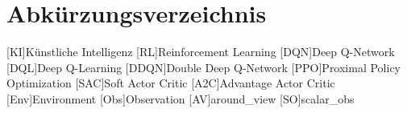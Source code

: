 \chapter{Abkürzungsverzeichnis}
\begin{acronym}
	[KI]{Künstliche Intelligenz}
	[RL]{Reinforcement Learning}
	[DQN]{Deep Q-Network}
	[DQL]{Deep Q-Learning}
	[DDQN]{Double Deep Q-Network}
	[PPO]{Proximal Policy Optimization}
	[SAC]{Soft Actor Critic}
	[A2C]{Advantage Actor Critic}
	[Env]{Environment}
	[Obs]{Observation}
	[AV]{around\_view}
	[SO]{scalar\_obs}
\end{acronym}
 